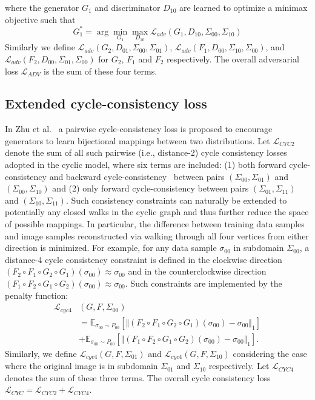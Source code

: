 \documentclass[10pt,twocolumn,letterpaper]{article}
\begin{document}
where the generator $G_1$ and discriminator $D_{10}$ are learned to optimize a minimax objective such that
\begin{equation}
G_1^*=\arg\min_{G_1}\max_{D_{10}}\mathcal{L}_{adv}(G_1,D_{10},\Sigma_{00},\Sigma_{10})
\end{equation}
Similarly we define $\mathcal{L}_{adv}(G_2,D_{01},\Sigma_{00},\Sigma_{01})$, $\mathcal{L}_{adv}(F_1,D_{00},\Sigma_{10},\Sigma_{00})$, and $\mathcal{L}_{adv}(F_2,D_{00},\Sigma_{01},\Sigma_{00})$ for $G_2$, $F_1$ and $F_2$ respectively. The overall adversarial loss $\mathcal{L}_{ADV}$ is the sum of these four terms.



\subsection{Extended cycle-consistency loss}
In Zhu et al.~\cite{CycleGAN} a pairwise cycle-consistency loss is proposed to encourage generators to learn bijectional mappings between two distributions. Let $\mathcal{L}_{CYC2}$ denote the sum of all such pairwise (i.e., distance-2) cycle consistency losses adopted in the cyclic model, where six terms are included: (1) both forward cycle-consistency and backward cycle-consistency~\cite{CycleGAN} between pairs $(\Sigma_{00},\Sigma_{01})$ and $(\Sigma_{00},\Sigma_{10})$ and (2) only forward cycle-consistency between pairs  $(\Sigma_{01},\Sigma_{11})$ and $(\Sigma_{10},\Sigma_{11})$. Such consistency constraints can naturally be extended to potentially any closed walks in the cyclic graph and thus further reduce the space of possible mappings. In particular, the difference between training data samples and image samples reconstructed via walking through all four vertices from either direction is minimized. For example, for any data sample $\sigma_{00}$ in subdomain $\Sigma_{00}$, a distance-4 cycle consistency constraint is defined in the clockwise direction $(F_2 \circ F_1 \circ G_2 \circ G_1)(\sigma_{00})\approx \sigma_{00}$ and in the counterclockwise direction $(F_1\circ F_2\circ G_1\circ G_2)(\sigma_{00})\approx \sigma_{00}$. Such constraints are implemented by the penalty function:
\begin{align}
\mathcal{L}_{cyc4}&(G,F,\Sigma_{00}) \nonumber \\
&= \mathbb{E}_{\sigma_{00}\sim P_{00}}[\Vert (F_2\circ F_1\circ G_2\circ G_1)(\sigma_{00})-\sigma_{00}\Vert_1] \nonumber \\
&+\mathbb{E}_{\sigma_{00}\sim P_{00}}[\Vert (F_1\circ F_2\circ G_1\circ G_2)(\sigma_{00})-\sigma_{00}\Vert_1].
\end{align}
Similarly, we define $\mathcal{L}_{cyc4}(G,F,\Sigma_{01})$ and $\mathcal{L}_{cyc4}(G,F,\Sigma_{10})$ considering the case where the original image is in subdomain $\Sigma_{01}$ and $\Sigma_{10}$ respectively. Let $\mathcal{L}_{CYC4}$ denotes the sum of these three terms. The overall cycle consistency loss $\mathcal{L}_{CYC}=\mathcal{L}_{CYC2}+\mathcal{L}_{CYC4}$.
\end{document}
